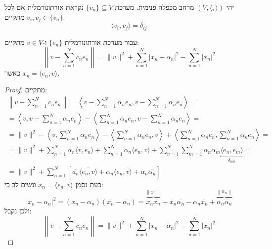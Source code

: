 \documentclass{tstextbook}
\begin{document}
\begin{definition}
יהי \(\left( V,\langle , \rangle \right)\) מרחב מכפלה פנימית. מערכת \(\{ v_{n} \}\subseteq V\) נקראת אורתונורמלית אם לכל \(v_{i},v_{j}\in \{ v_{n} \}\) מתקיים:
$$\langle v_{i},v_{j} \rangle =\delta_{ij}$$

\end{definition}
\begin{lemma}
עבור מערכת אורתונורמלית \(\{ e_{n} \}\) ו-\(v \in V\) מתקיים:
$$\left\lVert  v-\sum_{n=1}^{N} c_{n}e_{n}  \right\rVert =\|v\|^{2}+\sum_{n=1}^{N}\left|x_{n}-\alpha_{n}\right|^{2}-\sum_{n=1}^{N}\left|x_{n}\right|^{2}$$
כאשר \(x_{n}=\langle e_{n},v \rangle\).

\end{lemma}
\begin{proof}
מתקיים:
\begin{gather*}\left\lVert  v-\sum_{n=1}^{N} c_{n}e_{n}  \right\rVert =\left\langle v-\sum_{n=1}^{N}\alpha_{n}e_{n},v-\sum_{n=1}^{N}\alpha_{n}e_{n}\right\rangle= \\=\left\langle  v,v-\sum_{n=1}^{N} \alpha_{n}e_{n}  \right\rangle -\left\langle  \sum_{n=1}^{N} \alpha_{n}e_{n},v-\sum_{n=1}^{N} \alpha_{n}e_{n}  \right\rangle = \\= \lVert v \rVert^{2}-\left\langle  v, \sum_{n=1}^{N} \alpha_{n}e_{n}  \right\rangle  -\left\langle  \sum_{n=1}^{N} \alpha_{n}e_{n},v  \right\rangle+\left\langle  \sum_{n=1}^{N} \alpha_{n}e_{n},\sum_{n=1}^{N} \alpha_{n}e_{n}  \right\rangle  = \\=\lVert v \rVert ^{2}+\sum_{n=1}^{N}  \overline{\alpha} _{n}\langle v,e_{n} \rangle +\sum_{n=1}^{N} \alpha_{n}\langle e_{n},v \rangle +\sum_{n=1}^{N}\sum_{m=1}^{N}\alpha_{n}\overline{\alpha_{m}} \underbracket{ \langle e_{n},e_{m} \rangle }_{ \delta_{nm} } = \\=\lVert v \rVert ^{2}+\sum_{n=1}^{N} \left[  \overline{a_{n}} \overline{\langle e_{n},v \rangle }  +\alpha_{n}\langle e_{n},v \rangle +\alpha_{n}\overline{\alpha_{n}}   \right]
\end{gather*}
כעת נסמן \(x_{n}=\langle e_{n},v \rangle\) ונשים לב כי:
$$\left\lvert  x_{n}-\alpha_{n}  \right\rvert ^{2}=\left( x_{n}-\alpha_{n} \right)\left( \overline{x_{n}} -\overline{\alpha_{n}}  \right)=\overbrace{ x_{n}\overline{x_{n}} }^{ \lVert x_{n} \rVert  } -x_{n}\overline{\alpha_{n}} -\alpha_{n}\overline{x_{n}} +\overbrace{ \alpha_{n}\overline{\alpha_{n}} }^{ \left\lVert  \alpha_{n}  \right\rVert  } $$
ולכן נקבל:
$$\left\lVert  v-\sum_{n=1}^{N} c_{n}e_{n}  \right\rVert =
\|v\|^{2}+\sum_{n=1}^{N}\left|x_{n}-\alpha_{n}\right|^{2}-\sum_{n=1}^{N}\left|x_{n}\right|^{2}$$

\end{proof}
\end{document}
